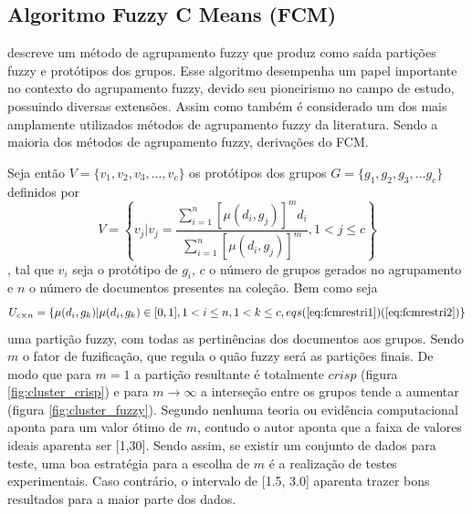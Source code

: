 \subsection{Algoritmo Fuzzy C Means (FCM)} \cite{Bezdek1984} descreve um método de agrupamento fuzzy
que produz como saída partições fuzzy e protótipos dos grupos. Esse algoritmo desempenha um papel
importante no contexto do agrupamento fuzzy, devido seu pioneirismo no campo de estudo, possuindo
diversas extensões. Assim como também é considerado um dos mais amplamente utilizados métodos de
agrupamento fuzzy da literatura\cite{Pal2005}. Sendo a maioria dos métodos de agrupamento fuzzy,
derivações do FCM\cite{Krishnapuram1993}.

Seja então $V = \{v_1,v_2,v_3,...,v_c\}$ os protótipos dos grupos $G = \{g_1,g_2,g_3,...g_c\}$
definidos por 
\begin{equation} 
  V = \left\{ v_j | v_j = \frac{\sum_{i=1}^n[\mu(d_i,g_j)]^m d_i}{\sum_{i=1}^n[\mu(d_i,g_j)]^m}, 
  1 < j \leq c \right\} 
  \label{eq:prototipos} 
\end{equation}
, tal
que $v_i$ seja o protótipo de $g_i$, $c$ o número de grupos gerados no agrupamento e $n$ o número de
documentos presentes na coleção. Bem como seja 
\begin{equation} 
  U_{c \times n} = \{\mu(d_i, g_k) |\mu(d_i, g_k) \in [0,1], 1 < i \leq n, 1 < k \leq c, eqs
  (\ref{eq:fcmrestri1})(\ref{eq:fcmrestri2})\} 
  \label{eq:part_fuzzy} 
\end{equation} 
uma partição fuzzy, com todas as pertinências dos documentos aos grupos. Sendo $m$ o fator de
fuzificação, que regula o quão fuzzy será as partições finais. De modo que para $m = 1$ a partição
resultante é totalmente $crisp$ (figura \ref{fig:cluster_crisp}) e para $m \rightarrow \infty$ a
interseção entre os grupos tende a aumentar (figura
\ref{fig:cluster_fuzzy})\cite{Pal2005}\cite{Nogueira2013}. Segundo \cite{Bezdek1984} nenhuma teoria
ou evidência computacional aponta para um valor ótimo de $m$, contudo o autor aponta que a faixa de
valores ideais aparenta ser [1,30]. Sendo assim, se existir um conjunto de dados para teste, uma boa
estratégia para a escolha de $m$ é a realização de testes experimentais. Caso contrário, o intervalo
de [1.5, 3.0] aparenta trazer bons resultados para a maior parte dos dados.


